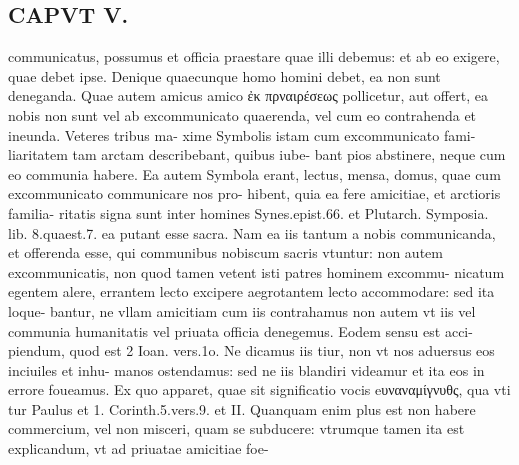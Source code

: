 \documentclass{article}
\begin{document}
\begin{pages}
\section*{CAPVT  V. }
\marginpar{[ p.405 ]}\pstart communicatus, possumus et officia praestare quae illi debemus: et ab eo exigere, quae debet ipse. Denique quaecunque homo homini debet, ea non sunt deneganda. Quae autem amicus amico ἐκ πρναιρέσεως pollicetur, aut offert, ea nobis non sunt vel ab excommunicato quaerenda, vel cum eo contrahenda et ineunda. Veteres tribus ma- xime Symbolis istam cum excommunicato fami- liaritatem tam arctam describebant, quibus iube- bant pios abstinere, neque cum eo communia habere. Ea autem Symbola erant, lectus, mensa, domus, quae cum excommunicato communicare nos pro- hibent, quia ea fere amicitiae, et arctioris familia- ritatis signa sunt inter homines Synes.epist.66. et Plutarch. Symposia. lib.  8.quaest.7. ea putant esse sacra. Nam ea iis tantum a nobis communicanda, et offerenda esse, qui communibus nobiscum sacris vtuntur: non autem excommunicatis, non quod tamen vetent isti patres hominem excommu- nicatum egentem alere, errantem lecto excipere aegrotantem lecto accommodare: sed ita loque- bantur, ne vllam amicitiam cum iis contrahamus non autem vt iis vel communia humanitatis vel priuata officia denegemus. Eodem sensu est acci- piendum, quod est 2 Ioan. vers.1o. Ne dicamus iis tiur, non vt nos aduersus eos inciuiles et inhu- manos ostendamus: sed ne iis blandiri videamur et ita eos in errore foueamus. Ex quo apparet, quae sit significatio vocis eυναναμίγνυθς, qua vti tur Paulus et 1. Corinth.5.vers.9. et II. Quanquam enim plus est non habere commercium, vel non misceri, quam se subducere: vtrumque tamen ita est explicandum, vt ad priuatae amicitiae foe-  \pend

\end{pages}
\end{document}
